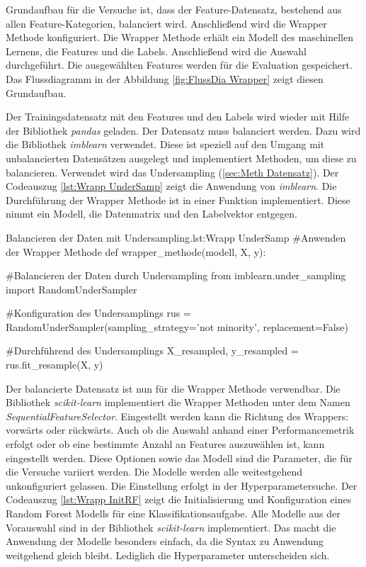 Grundaufbau für die Versuche ist, dass der Feature-Datensatz, bestehend aus allen Feature-Kategorien, balanciert wird. Anschließend wird die Wrapper Methode konfiguriert. Die Wrapper Methode erhält ein Modell des maschinellen Lernens, die Features und die Labels. Anschließend wird die Auswahl durchgeführt. Die ausgewählten Features werden für die Evaluation gespeichert. Das Flussdiagramm in der Abbildung \ref{fig:FlussDia Wrapper} zeigt diesen Grundaufbau. 

Der Trainingsdatensatz mit den Features und den Labels wird wieder mit Hilfe der Bibliothek \textit{pandas} geladen. Der Datensatz muss balanciert werden. Dazu wird die Bibliothek \textit{imblearn} verwendet. Diese ist speziell auf den Umgang mit unbalancierten Datensätzen ausgelegt und implementiert Methoden, um diese zu balancieren. Verwendet wird das Undersampling (\autoref{sec:Meth Datensatz}). Der Codeauszug \ref{lst:Wrapp UnderSamp} zeigt die Anwendung von \textit{imblearn}. Die Durchführung der Wrapper Methode ist in einer Funktion implementiert. Diese nimmt ein Modell, die Datenmatrix und den Labelvektor entgegen. 

\begin{pythoncode}{Balancieren der Daten mit Undersampling.}{lst:Wrapp UnderSamp}
#Anwenden der Wrapper Methode
def wrapper_methode(modell, X, y):

    #Balancieren der Daten durch Undersampling
    from imblearn.under_sampling import RandomUnderSampler

    #Konfiguration des Undersamplings
    rus = RandomUnderSampler(sampling_strategy='not minority', 
                             replacement=False)
    
    #Durchführend des Undersamplings
    X_resampled, y_resampled = rus.fit_resample(X, y)

\end{pythoncode}

Der balancierte Datensatz ist nun für die Wrapper Methode verwendbar. Die Bibliothek \textit{scikit-learn} implementiert die Wrapper Methoden unter dem Namen \textit{SequentialFeatureSelector}. Eingestellt werden kann die Richtung des Wrappers: vorwärts oder rückwärts. Auch ob die Auswahl anhand einer Performancemetrik erfolgt oder ob eine bestimmte Anzahl an Features auszuwählen ist, kann eingestellt werden. Diese Optionen sowie das Modell sind die Parameter, die für die Versuche variiert werden. Die Modelle werden alle weitestgehend unkonfiguriert gelassen. Die Einstellung erfolgt in der Hyperparametersuche. Der Codeauszug \ref{lst:Wrapp InitRF} zeigt die Initialisierung und Konfiguration eines Random Forest Modells für eine Klassifikationsaufgabe. Alle Modelle aus der Vorauswahl sind in der Bibliothek \textit{scikit-learn} implementiert. Das macht die Anwendung der Modelle besonders einfach, da die Syntax zu Anwendung weitgehend gleich bleibt. Lediglich die Hyperparameter unterscheiden sich. 

